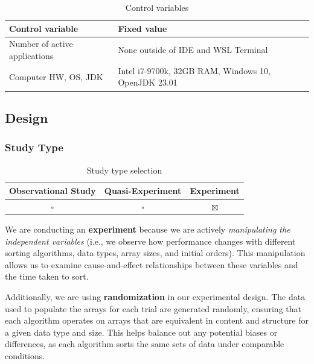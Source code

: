 \documentclass{article}
\begin{document}
\begin{table}[h!]
    \centering
    \begin{tabular}{l|l}
        \textbf{Control variable}     & \textbf{Fixed value}                                \\ \hline
        Number of active applications & None outside of IDE and WSL Terminal                \\
        Computer HW, OS, JDK          & Intel i7-9700k, 32GB RAM, Windows 10, OpenJDK 23.01 \\
    \end{tabular}
    \caption{Control variables}
\end{table}

\FloatBarrier

\subsection{Design}
\subsubsection{Study Type}

\begin{table}[!h]
    \centering
    \begin{tabular}{c|c|c}
        \textbf{Observational Study} & \textbf{Quasi-Experiment} & \textbf{Experiment} \\ \hline
        \(\square\)                  & \(\square\)               & \(\boxtimes\)       \\
    \end{tabular}
    \caption{Study type selection}
\end{table}

We are conducting an \textbf{experiment} because we are actively \textit{manipulating the independent variables} (i.e., we observe how performance changes with different sorting algorithms, data types, array sizes, and initial orders). This manipulation allows us to examine cause-and-effect relationships between these variables and the time taken to sort.

Additionally, we are using \textbf{randomization} in our experimental design. The data used to populate the arrays for each trial are generated randomly, ensuring that each algorithm operates on arrays that are equivalent in content and structure for a given data type and size. This helps balance out any potential biases or differences, as each algorithm sorts the same sets of data under comparable conditions.
\end{document}
